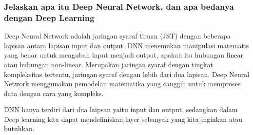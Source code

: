 \subsubsection{Jelaskan apa itu Deep Neural Network, dan apa bedanya dengan Deep Learning}
Deep Neural Network adalah jaringan syaraf tiruan (JST) dengan beberapa lapisan antara lapisan input dan output. DNN menemukan manipulasi matematis yang benar untuk mengubah input menjadi output, apakah itu hubungan linear atau hubungan non-linear. Merupakan jaringan syaraf dengan tingkat kompleksitas tertentu, jaringan syaraf dengan lebih dari dua lapisan. Deep Neural Network menggunakan pemodelan matematika yang canggih untuk memproses data dengan cara yang kompleks.

DNN hanya terdiri dari dua laipsan yaitu input dan output, sedangkan dalam Deep learning kita dapat mendefiniskan layer sebanyak yang kita inginkan atau butuhkan.

